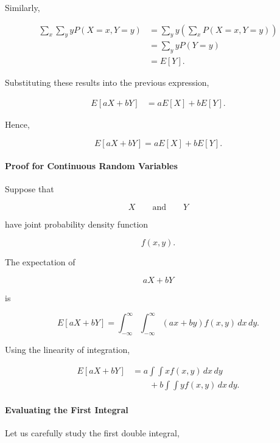 \documentclass[11pt]{article}
\begin{document}
\begin{mdframed}[
		linewidth=0.8pt,
		roundcorner=6pt,
		backgroundcolor=gray!5,
		linecolor=gray!60,
		innertopmargin=10pt,
		innerbottommargin=10pt,
		innerleftmargin=10pt,
		innerrightmargin=10pt
		]
		Similarly,
		
		\[
		\begin{aligned}
			\sum_x
			\sum_y
			yP(X=x,Y=y)
			&=
			\sum_y
			y
			\left(
			\sum_x
			P(X=x,Y=y)
			\right)
			\\[0.3cm]
			&=
			\sum_y
			yP(Y=y)
			\\[0.3cm]
			&=
			E[Y].
		\end{aligned}
		\]
		
		Substituting these results into the previous expression,
		
		\[
		\begin{aligned}
			E[aX+bY]
			&=
			aE[X]
			+
			bE[Y].
		\end{aligned}
		\]
		
		Hence,
		
		\[
		\boxed{
			E[aX+bY]
			=
			aE[X]+bE[Y].
		}
		\]
		
		\bigskip
		
		\paragraph{Proof for Continuous Random Variables}
		
		Suppose that
		
		\[
		X \qquad \text{and} \qquad Y
		\]
		
		have joint probability density function
		
		\[
		f(x,y).
		\]
		
		The expectation of
		
		\[
		aX+bY
		\]
		
		is
		
		\[
		E[aX+bY]
		=
		\int_{-\infty}^{\infty}
		\int_{-\infty}^{\infty}
		(ax+by)
		f(x,y)
		\,dx\,dy.
		\]
		
		Using the linearity of integration,
		
		\[
		\begin{aligned}
			E[aX+bY]
			&=
			a
			\int\!\!\!\int
			x
			f(x,y)
			\,dx\,dy
			\\
			&\qquad
			+
			b
			\int\!\!\!\int
			y
			f(x,y)
			\,dx\,dy.
		\end{aligned}
		\]
		
		\paragraph{Evaluating the First Integral}
		
		Let us carefully study the first double integral,
		

\end{mdframed}
\end{document}
